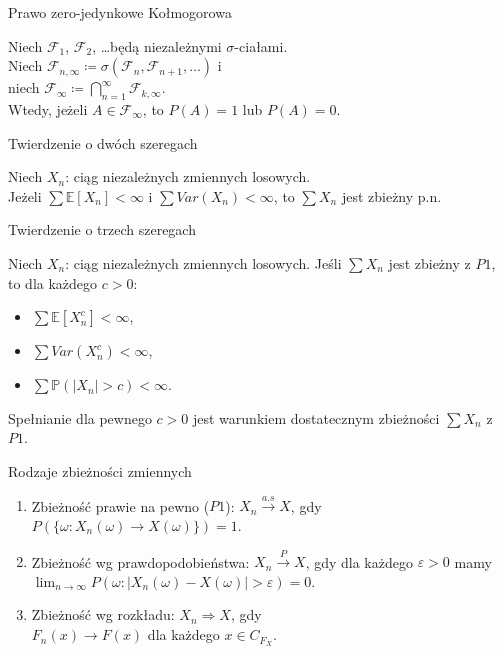 \documentclass[avery5371,grid,frame]{flashcards}
\begin{document}
\begin{flashcard}[Twierdzenie]{Prawo zero-jedynkowe Kołmogorowa}

\smallskip
Niech $\mathcal{F}_1$, $\mathcal{F}_2$, \dots będą niezależnymi $\sigma$-ciałami. \\
Niech $\mathcal{F}_{n, \infty} \coloneqq \sigma(\mathcal{F}_n, \mathcal{F}_{n+1}, \dots)$ i \\ niech $\mathcal{F}_\infty \coloneqq \bigcap \limits_{n=1}^\infty \mathcal{F}_{k, \infty}$. \\
Wtedy, jeżeli $A \in \mathcal{F}_\infty$, to $P(A) = 1$ lub $P(A) = 0$.
\end{flashcard}

\begin{flashcard}[Twierdzenie]{Twierdzenie o dwóch szeregach}

\smallskip
Niech $X_n$: ciąg niezależnych zmiennych losowych. \\
Jeżeli $\sum \mathbb{E}[X_n] < \infty$ i $\sum Var(X_n) < \infty$, to $\sum X_n$ jest zbieżny p.n.
\end{flashcard}

\begin{flashcard}[Twierdzenie]{Twierdzenie o trzech szeregach}

\smallskip
Niech $X_n$: ciąg niezależnych zmiennych losowych. Jeśli $\sum X_n$ jest zbieżny z $P1$, to dla każdego $c > 0$:
\begin{itemize}
	\item $\sum \mathbb{E}[X_n^c] < \infty$,
	\item $\sum Var(X_n^c) < \infty$,
	\item $\sum \mathbb{P}(|X_n| > c) < \infty$.
\end{itemize}
Spełnianie dla pewnego $c > 0$ jest warunkiem dostatecznym zbieżności $\sum X_n$ z $P1$.
\end{flashcard}

\begin{flashcard}[Definicja]{Rodzaje zbieżności zmiennych}

\smallskip
\begin{enumerate}
	\item Zbieżność prawie na pewno ($P1$): $X_n \xrightarrow{a.s} X$, gdy $P(\{\omega: X_n(\omega) \rightarrow X(\omega)\}) = 1$.
	\item Zbieżność wg prawdopodobieństwa: $X_n \xrightarrow{P} X$, gdy dla każdego $\varepsilon > 0$ mamy \\
	$\lim_{n \to \infty} P(\omega : |X_n(\omega) - X(\omega)| > \varepsilon) = 0$.
	\item Zbieżność wg rozkładu: $X_n \Rightarrow X$, gdy \\ 
	$F_n(x) \to F(x)$ dla każdego $x \in C_{F_X}$.
\end{enumerate}
\end{flashcard}
\end{document}
